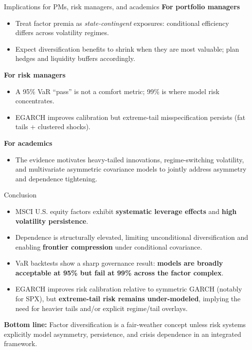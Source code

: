 \documentclass[10pt,aspectratio=169]{beamer}
\newcommand{\sm}{\small}
\begin{document}
\begin{frame}{Implications for PMs, risk managers, and academics}
\sm
\textbf{For portfolio managers}
\begin{itemize}
  \item Treat factor premia as \emph{state-contingent} exposures: conditional efficiency differs across volatility regimes.
  \item Expect diversification benefits to shrink when they are most valuable; plan hedges and liquidity buffers accordingly.
\end{itemize}

\textbf{For risk managers}
\begin{itemize}
  \item A 95\% VaR ``pass'' is not a comfort metric; 99\% is where model risk concentrates.
  \item EGARCH improves calibration but extreme-tail misspecification persists (fat tails + clustered shocks).
\end{itemize}

\textbf{For academics}
\begin{itemize}
  \item The evidence motivates heavy-tailed innovations, regime-switching volatility, and multivariate asymmetric covariance models to jointly address asymmetry and dependence tightening.
\end{itemize}
\end{frame}

\begin{frame}{Conclusion}
\sm
\begin{itemize}
  \item MSCI U.S. equity factors exhibit \textbf{systematic leverage effects} and \textbf{high volatility persistence}.
  \item Dependence is structurally elevated, limiting unconditional diversification and enabling \textbf{frontier compression} under conditional covariance.
  \item VaR backtests show a sharp governance result: \textbf{models are broadly acceptable at 95\% but fail at 99\% across the factor complex}.
  \item EGARCH improves risk calibration relative to symmetric GARCH (notably for SPX), but \textbf{extreme-tail risk remains under-modeled}, implying the need for heavier tails and/or explicit regime/tail overlays.
\end{itemize}
\vspace{1mm}
\textbf{Bottom line:} Factor diversification is a fair-weather concept unless risk systems explicitly model asymmetry, persistence, and crisis dependence in an integrated framework.
\end{frame}
\end{document}
